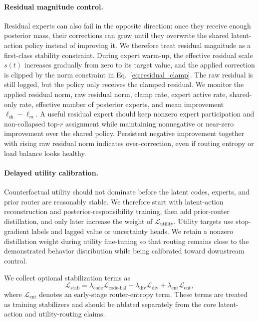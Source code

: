 \documentclass[10pt]{article}
\begin{document}
\paragraph{Residual magnitude control.}
Residual experts can also fail in the opposite direction: once they receive
enough posterior mass, their corrections can grow until they overwrite the
shared latent-action policy instead of improving it. We therefore treat residual
magnitude as a first-class stability constraint. During expert warm-up, the
effective residual scale $s(t)$ increases gradually from zero to its target
value, and the applied correction is clipped by the norm constraint in
Eq.~\eqref{eq:residual_clamp}. The raw residual is still logged, but the policy
only receives the clamped residual. We monitor the applied residual norm, raw
residual norm, clamp rate, expert active rate, shared-only rate, effective
number of posterior experts, and mean improvement
$\ell_{\mathrm{sh}}-\ell_m$. A useful residual expert should keep nonzero
expert participation and non-collapsed top-$r$ assignment while maintaining
nonnegative or near-zero improvement over the shared policy. Persistent negative
improvement together with rising raw residual norm indicates over-correction,
even if routing entropy or load balance looks healthy.

\paragraph{Delayed utility calibration.}
Counterfactual utility should not dominate before the latent codes, experts, and prior router are reasonably stable. We therefore start with latent-action reconstruction and posterior-responsibility training, then add prior-router distillation, and only later increase the weight of $\mathcal{L}_{\mathrm{utility}}$. Utility targets use stop-gradient labels and lagged value or uncertainty heads. We retain a nonzero distillation weight during utility fine-tuning so that routing remains close to the demonstrated behavior distribution while being calibrated toward downstream control.

We collect optional stabilization terms as
\begin{equation}
\mathcal{L}_{\mathrm{stab}}
=\lambda_{\mathrm{code}}\mathcal{L}_{\mathrm{code\mbox{-}bal}}
+\lambda_{\mathrm{div}}\mathcal{L}_{\mathrm{div}}
+\lambda_{\mathrm{ent}}\mathcal{L}_{\mathrm{ent}},
\end{equation}
where $\mathcal{L}_{\mathrm{ent}}$ denotes an early-stage router-entropy term. These terms are treated as training stabilizers and should be ablated separately from the core latent-action and utility-routing claims.
\end{document}
